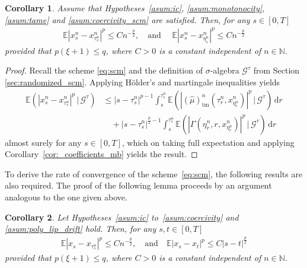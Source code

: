 \documentclass[reqno,  oneside, 12pt]{amsart}
\newtheorem{cor}{Corollary}[section]
\begin{document}
\begin{cor} \label{cor:one_step_error}
	Assume that Hypotheses~{\mbox{\normalfont  \ref{asum:ic}}, \mbox{\normalfont  \ref{asum:monotonocity}},      \mbox{\normalfont  \ref{asum:tame}} and \mbox{\normalfont  \ref{asum:coercivity_scm}}}  are satisfied. Then, for any \( s \in [0, T] \)
	\begin{align*}
		\mathbb{E}|x_s^{n} - x_{\tau^n_s}^{n}|^{p} \leq C n^{-\frac{p}{2}}, \quad \mbox{and } \quad	\mathbb{E}|x_s^{n} - x_{\eta^n_s}^{n}|^{p} \leq C n^{-\frac{p}{2}}
	\end{align*}
	provided that \( p(\xi + 1) \leq q \), where \( C > 0 \) is a constant independent of \( n \in \mathbb{N} \).
\end{cor}

\begin{proof}
	Recall the scheme \eqref{eq:scm} and the definition of $\sigma$-algebra $\mathscr{G}^{\tau}$ from Section \ref{sec:randomized_scm}. Applying H\"older's  and martingale inequalities yields
	\begin{align*}
		\mathbb {E}\left(|x_s^n - x_{\tau^n_s}^n|^p \,\big|\, \mathscr{G}^{\tau} \right)
		&\leq |s - \tau^n_s|^{p - 1} \int_{s}^{\tau^n_s} \mathbb{E}\left( |(\widehat\mu)_{\mathrm{tm}}^{n}({\tau_r^n}, x_{\eta_r^n}^n)|^p \,\big|\, \mathscr{G}^{\tau} \right) \, \mathrm{d}r \\
		&\quad + |s - \tau^n_s|^{\frac{p}{2} - 1} \int_{s}^{\tau^n_s} \mathbb{E}\left( |\Gamma(\eta_r^n,r, x_{\eta_r^n}^n)|^p \,\big|\, \mathscr{G}^{\tau} \right) \, \mathrm{d}r
	\end{align*}
	almost surely for any $s\in[0,T]$, which on taking full expectation and applying Corollary~\ref{cor:_coefficients_mb} yields the result. 
\end{proof}



To derive the rate of convergence of the scheme~\eqref{eq:scm}, the following results are also required.
The proof of the following lemma proceeds by an argument analogous to the one given above.
\begin{cor} \label{cor:one_step_regularity_sde}
	Let Hypotheses~\mbox{\normalfont\ref{asum:ic}} to~\mbox{\normalfont\ref{asum:coercivity}} and \ref{asum:poly_lip_drift} hold. Then, for any \( s,t \in [0, T] \)
	\begin{align*}
		\mathbb{E}|x_s - x_{\tau^n_s}|^p \leq C n^{-\frac{p}{2}},  
		\quad \text{and} \quad 
		\mathbb{E}|x_s - x_t|^p \leq C |s - t|^{\frac{p}{2}}
	\end{align*}
	provided that \( p(\xi + 1) \leq q \), where \( C > 0 \) is a constant independent of \( n \in \mathbb{N} \).
\end{cor}
\end{document}
